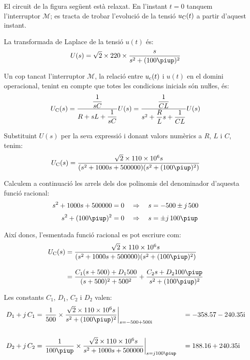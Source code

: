 \break	
\begin{exemple}\label{ex:CircuitLaplaceNul}	
	\addcontentsxms{\CircuitLaplaceNul}
    El circuit de la figura següent està relaxat. En l'instant $t=0$
    tanquem l'interruptor $\mathscr{M}$; es tracta de trobar l'evolució de la tensió
    $u_\mathrm{C}(t)$ a partir d'aquest instant.

    \begin{center}
        
    \end{center}

    La transformada de Laplace de la tensió $u(t)$ és:
    \[
        U(s) = \sqrt{2}\times 220\times \frac{s}{s^2 + (100\piup)^2}
    \]

    Un cop tancat l'interruptor $\mathscr{M}$, la relació entre $u_\mathrm{c}(t)$ i
    $u(t)$ en el domini operacional, tenint en compte que totes les
    condicions inicials són nuŀles, és:
    \[
        U_\mathrm{C}(s) = \frac{\dfrac{1}{sC}}{R+ sL +\dfrac{1}{sC}} U(s)=
        \frac{\dfrac{1}{CL}}{s^2 + \dfrac{R}{L}s +\dfrac{1}{CL}} U(s)
    \]

    Substituint $U(s)$ per la seva expressió i donant valors numèrics a
    $R$, $L$ i $C$, tenim:
    \[
        U\ped{C}(s) = \frac{\sqrt{2}\times 110\times 10^6 s}{(s^2 + 1000 s + 500000)(s^2 + (100\piup)^2)}
    \]

    Calculem a continuació les arrels dels dos polinomis  del
    denominador d'aquesta funció racional:
    \begin{align*}
        s^2 + 1000 s + 500000 &= 0 \quad\Rightarrow\quad s = -500
        \pm j\,500 \\[0.5ex]
        s^2 + (100\piup)^2 &= 0 \quad\Rightarrow\quad s = \pm j\,100\piup
    \end{align*}

    Així doncs, l'esmentada funció racional es pot escriure com:
    \[\begin{split}
    U\ped{C}(s) &= \frac{\sqrt{2}\times 110\times 10^6 s}{(s^2 + 1000 s +
    500000)(s^2 + (100\piup)^2)}   \\[2ex] &= \frac{C_1 (s+500) + D_1
    500}{(s+500)^2+500^2} + \frac{C_2 s + D_2 100 \piup}{s^2 +(100\piup)^2}
    \end{split}\]

    Les constants $C_1$, $D_1$,  $C_2$ i $D_2$ valen:
    \begin{alignat*}{2}
        D_1 + j\,C_1 &= \left.\frac{1}{500}\times \frac{\sqrt{2}\times 110\times 10^6 s}
        {s^2 +(100\piup)^2}\right|_{s=\complexnum{-500+j500}} &&= \complexnum{-358,57 -j 240,35}\\[3.5ex]
        D_2 + j\,C_2 &= \left.\frac{1}{100\piup}\times\frac{\sqrt{2}\times 110\times 10^6 s}
        {s^2 + 1000 s + 500000}\right|_{s=j 100\piup} &&= \complexnum{188,16 + j240,35}
    \end{alignat*}


\end{exemple}

